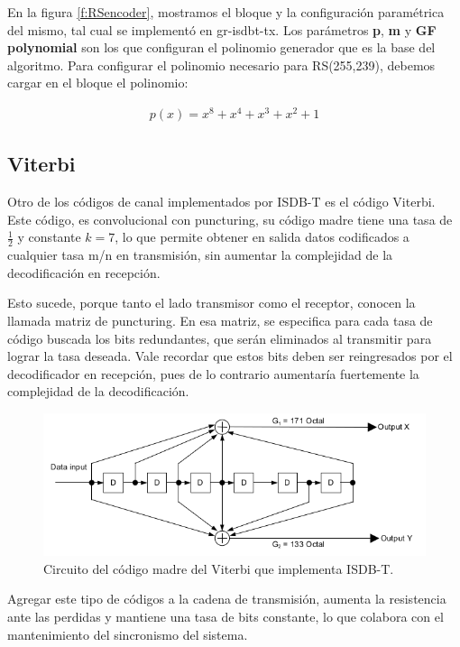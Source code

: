 En la figura \ref{f:RSencoder}, mostramos el bloque y la configuración paramétrica del mismo, tal cual se implementó en gr-isdbt-tx. Los parámetros \textbf{p}, \textbf{m} y \textbf{GF polynomial} son los que configuran el polinomio generador que es la base del algoritmo. Para configurar el polinomio necesario para RS(255,239), debemos cargar en el bloque el polinomio:

\begin{gather*}
	p(x) = x^8 + x^4 + x^3 + x^2 + 1
\end{gather*}

	\subsection{Viterbi}
	Otro de los códigos de canal implementados por ISDB-T es el código Viterbi. Este código, es  convolucional con puncturing, su código madre tiene una tasa de $\frac{1}{2}$ y constante $k = 7$, lo que permite obtener en salida datos codificados a cualquier tasa m/n en transmisión, sin aumentar la complejidad de la decodificación en recepción. 
	
	Esto sucede, porque tanto el lado transmisor como el receptor, conocen la llamada matriz de puncturing. En esa matriz, se especifica para cada tasa de código buscada los bits redundantes, que serán eliminados al transmitir para lograr la tasa deseada. Vale recordar que estos bits deben ser reingresados por el decodificador en recepción, pues de lo contrario aumentaría fuertemente la complejidad de la decodificación.
	
	\begin{figure}[h!]
		\centering
		\includegraphics[scale=0.5]{figuras/cap05/viterbi}
		\caption{\label{f:viterbi} Circuito del código madre del Viterbi que implementa ISDB-T.}
	\end{figure}
	
	Agregar este tipo de códigos a la cadena de transmisión, aumenta la resistencia ante las perdidas y mantiene una tasa de bits constante, lo que colabora con el mantenimiento del sincronismo del sistema.
	
